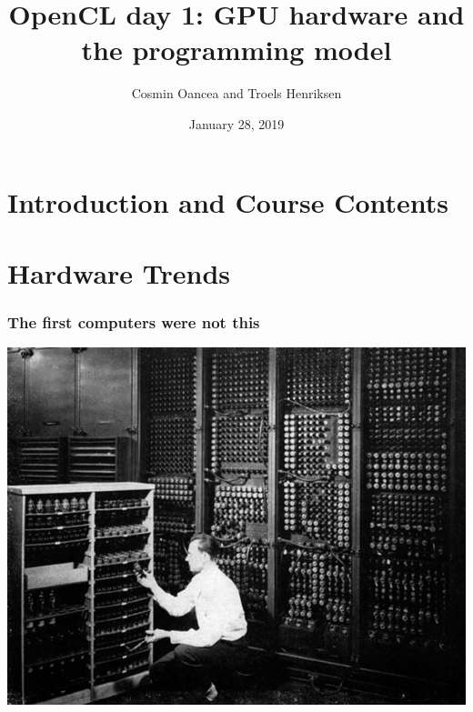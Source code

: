 \documentclass{beamer}
\title{OpenCL day 1: GPU hardware and the programming model}
\author{Cosmin Oancea and Troels Henriksen}
\date{January 28, 2019}
\begin{document}
\frame{\titlepage}

\section{Introduction and Course Contents}

\begin{frame}
  \tableofcontents[currentsection]
\end{frame}

\section{Hardware Trends}

\begin{frame}
	\tableofcontents[currentsection]
\end{frame}

\begin{frame}
  \frametitle{The first computers were not this}

  \begin{center}
    \includegraphics[width=\textwidth]{img/eniac.jpg}
  \end{center}

\end{frame}
\end{document}
